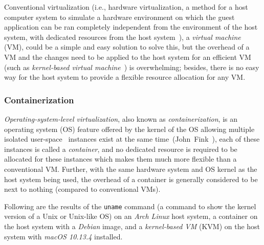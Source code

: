 \medskip

Conventional virtualization (i.e., hardware virtualization, a method for a
host computer system to simulate a hardware environment on which the guest
application can be ran completely independent from the environment of the host
system, with dedicated resources from the host system~\citep[chap. 16]{os}),
a \emph{virtual machine} (VM), could be a simple and easy solution to solve
this, but the overhead of a VM and the changes need to be applied to the host
system for an efficient VM (such as 
\emph{kernel-based virtual machine}~\cite{kvm}) is overwhelming;
besides, there is no easy way for the host system to provide a flexible
resource allocation for any VM.

\subsubsection{Containerization}
\emph{Operating-system-level virtualization}, also known as
\emph{containerization}, is an operating system (OS) feature offered by the
kernel of the OS allowing multiple isolated user-space~\citep[chap. 1.5.1]{os}
instances exist at the same time~(John~Fink~\cite{docker}),
each of these instances is called a \emph{container}, and no dedicated resource
is required to be allocated for these instances which makes them much more
flexible than a conventional VM. Further, with the same hardware system and
OS kernel as the host system being used, the overhead of a container is
generally considered to be next to nothing (compared to conventional VMs).

\pagebreak

Following are the results of the \texttt{uname} command
(a command to show the kernel version of a Unix or Unix-like OS)
on an \emph{Arch Linux} host system, a container on the host system
with a \emph{Debian} image, and a \emph{kernel-based VM} (KVM) on the host
system with \emph{macOS 10.13.4} installed.

\begin{centering}



\end{centering}